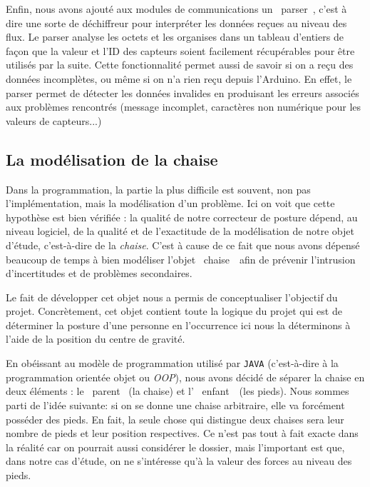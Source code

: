 \documentclass{polytech/polytech}
\begin{document}
Enfin, nous avons ajouté aux modules de communications un \guillemotleft ~parser~\guillemotright , c'est à dire une sorte de déchiffreur pour interpréter les données reçues au niveau des flux.
 Le parser analyse les octets et les organises dans un tableau d'entiers de façon que la valeur et l'ID des capteurs soient facilement récupérables pour être utilisés par la suite.
Cette fonctionnalité permet aussi de savoir si on a reçu des données incomplètes, ou même si on n'a rien reçu depuis l'Arduino. En effet, le parser permet de détecter les données invalides en produisant les erreurs associés aux problèmes rencontrés (message incomplet, caractères non numérique pour les valeurs de capteurs...)


\subsection{La modélisation de la chaise}
\label{subsec:model_chaise}
Dans la programmation, la partie la plus difficile est souvent, non pas l'implémentation, mais la modélisation d'un problème. Ici on voit que cette hypothèse est bien vérifiée : la qualité de notre correcteur de posture dépend, au niveau logiciel, de la qualité et de l'exactitude de la modélisation de notre objet d'étude, c'est-à-dire de la \textit{chaise}. C'est à cause de ce fait que nous avons dépensé beaucoup de temps à bien modéliser l'objet \guillemotleft ~chaise~\guillemotright\ afin de prévenir l'intrusion d'incertitudes et de problèmes secondaires.

Le fait de développer cet objet nous a permis de conceptualiser l'objectif du projet. Concrètement, cet objet contient toute la logique du projet qui est de déterminer la posture d'une personne en l'occurrence ici nous la déterminons à l'aide de la position du centre de gravité.

En obéissant au modèle de programmation utilisé par \texttt{JAVA} (c'est-à-dire à la programmation orientée objet ou \textit{OOP}), nous avons décidé de séparer la chaise en deux éléments : le \guillemotleft ~parent \guillemotright\ (la chaise) et l' \guillemotleft\ enfant~\guillemotright\ (les pieds).
Nous sommes parti de l'idée suivante: si on se donne une chaise arbitraire, elle va forcément posséder des pieds. En fait, la seule chose qui distingue deux chaises sera leur nombre de pieds et leur position respectives. Ce n'est pas tout à fait exacte dans la réalité car on pourrait aussi considérer le dossier, mais l'important est que, dans notre cas d'étude, on ne s'intéresse qu'à la valeur des forces au niveau des pieds.
\end{document}
